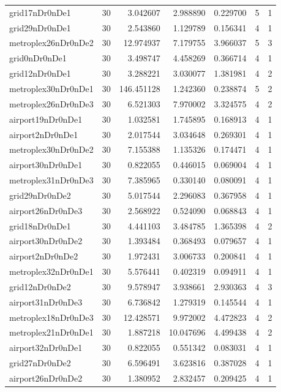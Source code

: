 \begin{longtable}{|l|r|r|r|r|r|r|}
grid17nDr0nDe1 & 30 & 3.042607 & 2.988890 & 0.229700 & 5 & 1 \\
grid29nDr0nDe1 & 30 & 2.543860 & 1.129789 & 0.156341 & 4 & 1 \\
metroplex26nDr0nDe2 & 30 & 12.974937 & 7.179755 & 3.966037 & 5 & 3 \\
grid0nDr0nDe1 & 30 & 3.498747 & 4.458269 & 0.366714 & 4 & 1 \\
grid12nDr0nDe1 & 30 & 3.288221 & 3.030077 & 1.381981 & 4 & 2 \\
metroplex30nDr0nDe1 & 30 & 146.451128 & 1.242360 & 0.238874 & 5 & 2 \\
metroplex26nDr0nDe3 & 30 & 6.521303 & 7.970002 & 3.324575 & 4 & 2 \\
airport19nDr0nDe1 & 30 & 1.032581 & 1.745895 & 0.168913 & 4 & 1 \\
airport2nDr0nDe1 & 30 & 2.017544 & 3.034648 & 0.269301 & 4 & 1 \\
metroplex30nDr0nDe2 & 30 & 7.155388 & 1.135326 & 0.174471 & 4 & 1 \\
airport30nDr0nDe1 & 30 & 0.822055 & 0.446015 & 0.069004 & 4 & 1 \\
metroplex31nDr0nDe3 & 30 & 7.385965 & 0.330140 & 0.080091 & 4 & 1 \\
grid29nDr0nDe2 & 30 & 5.017544 & 2.296083 & 0.367958 & 4 & 1 \\
airport26nDr0nDe3 & 30 & 2.568922 & 0.524090 & 0.068843 & 4 & 1 \\
grid18nDr0nDe1 & 30 & 4.441103 & 3.484785 & 1.365398 & 4 & 2 \\
airport30nDr0nDe2 & 30 & 1.393484 & 0.368493 & 0.079657 & 4 & 1 \\
airport2nDr0nDe2 & 30 & 1.972431 & 3.006733 & 0.200841 & 4 & 1 \\
metroplex32nDr0nDe1 & 30 & 5.576441 & 0.402319 & 0.094911 & 4 & 1 \\
grid12nDr0nDe2 & 30 & 9.578947 & 3.938661 & 2.930363 & 4 & 3 \\
airport31nDr0nDe3 & 30 & 6.736842 & 1.279319 & 0.145544 & 4 & 1 \\
metroplex18nDr0nDe3 & 30 & 12.428571 & 9.972002 & 4.472823 & 4 & 2 \\
metroplex21nDr0nDe1 & 30 & 1.887218 & 10.047696 & 4.499438 & 4 & 2 \\
airport32nDr0nDe1 & 30 & 0.822055 & 0.551342 & 0.083031 & 4 & 1 \\
grid27nDr0nDe2 & 30 & 6.596491 & 3.623816 & 0.387028 & 4 & 1 \\
airport26nDr0nDe2 & 30 & 1.380952 & 2.832457 & 0.209425 & 4 & 1 \\

\end{longtable}
